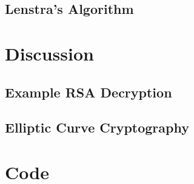\documentclass[a4paper,12pt,titlepage,oneside]{article}
\begin{document}
\subsection{Lenstra's Algorithm}


\clearpage

\section{Discussion}
\subsection{Example RSA Decryption}

\subsection{Elliptic Curve Cryptography}

\clearpage

\appendix
\section{Code}


\end{document}

